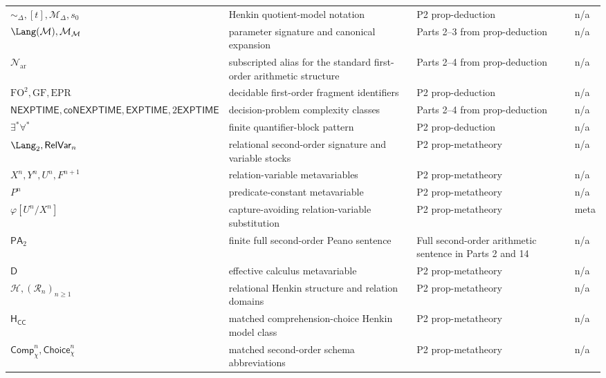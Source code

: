 \begin{longtable}{@{}p{}p{}p{}p{}@{}}
\(\sim_{\Delta},\allowbreak [t],\allowbreak \mathcal M_{\Delta},\allowbreak s_0\) & Henkin quotient-model notation & P2 prop-\allowbreak{}deduction & n/a \\
\(\Lang(\mathcal M),\allowbreak \mathcal M_{\mathcal M}\) & parameter signature and canonical expansion & Parts 2--3 from prop-\allowbreak{}deduction & n/a \\
\(\mathcal N_{\mathrm{ar}}\) & subscripted alias for the standard first-order arithmetic structure & Parts 2--4 from prop-\allowbreak{}deduction & n/a \\
\(\mathrm{FO}^{2},\allowbreak \mathrm{GF},\allowbreak \mathrm{EPR}\) & decidable first-order fragment identifiers & P2 prop-\allowbreak{}deduction & n/a \\
\(\mathsf{NEXPTIME},\allowbreak \mathsf{coNEXPTIME},\allowbreak \mathsf{EXPTIME},\allowbreak 2\mathsf{EXPTIME}\) & decision-problem complexity classes & Parts 2--4 from prop-\allowbreak{}deduction & n/a \\
\(\exists^{*}\forall^{*}\) & finite quantifier-block pattern & P2 prop-\allowbreak{}deduction & n/a \\
\(\Lang_2,\allowbreak \mathsf{RelVar}_n\) & relational second-order signature and variable stocks & P2 prop-\allowbreak{}metatheory & n/a \\
\(X^n,\allowbreak Y^n,\allowbreak U^n,\allowbreak F^{n+1}\) & relation-variable metavariables & P2 prop-\allowbreak{}metatheory & n/a \\
\(P^n\) & predicate-constant metavariable & P2 prop-\allowbreak{}metatheory & n/a \\
\(\varphi[U^n/X^n]\) & capture-avoiding relation-variable substitution & P2 prop-\allowbreak{}metatheory & meta \\
\(\mathsf{PA}_2\) & finite full second-order Peano sentence & Full second-\allowbreak{}order arithmetic sentence in Parts 2 and 14 & n/a \\
\(\mathsf D\) & effective calculus metavariable & P2 prop-\allowbreak{}metatheory & n/a \\
\(\mathcal H,\allowbreak (\mathcal R_n)_{n\geq1}\) & relational Henkin structure and relation domains & P2 prop-\allowbreak{}metatheory & n/a \\
\(\mathsf H_{\mathsf{CC}}\) & matched comprehension-choice Henkin model class & P2 prop-\allowbreak{}metatheory & n/a \\
\(\mathsf{Comp}_{\chi}^{n},\allowbreak \mathsf{Choice}_{\chi}^{n}\) & matched second-order schema abbreviations & P2 prop-\allowbreak{}metatheory & n/a \\

\end{longtable}
